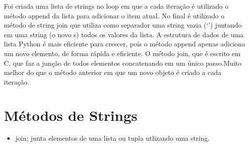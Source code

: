 \documentclass[letterpaper,10pt,brazil]{sphinxmanual}
\begin{document}
\begin{sphinxVerbatim}[commandchars=\\\{\}]
\end{sphinxVerbatim}

\begin{sphinxVerbatim}[commandchars=\\\{\}]
  

\end{sphinxVerbatim}

\begin{sphinxVerbatim}[commandchars=\\\{\}]
\end{sphinxVerbatim}

Foi criada uma lista de strings no loop em que a cada iteração é utilizado o método append da lista para adicionar o item atual.
No final é utilizado o método de string join que utiliza como separador uma string vazia (‘’) juntando em uma string (o novo s) todos os valores da lista.
A estrutura de dados de uma lista Python é mais eficiente para crescer, pois o método append apenas adiciona um novo elemento, de forma rápida e eficiente. O método join, que é escrito em C, que faz a junção de todos elementos concatenando em um único passo.Muito melhor do que o método anterior em que um novo objeto é criado a cada iteração.


\section{Métodos de Strings}
\label{\detokenize{content/str:metodos-de-strings}}\begin{itemize}
\item {} 
join; junta elementos de uma lista ou tupla utlizando uma string.

\end{itemize}

\begin{sphinxVerbatim}[commandchars=\\\{\}]
  

\end{sphinxVerbatim}
\end{document}
